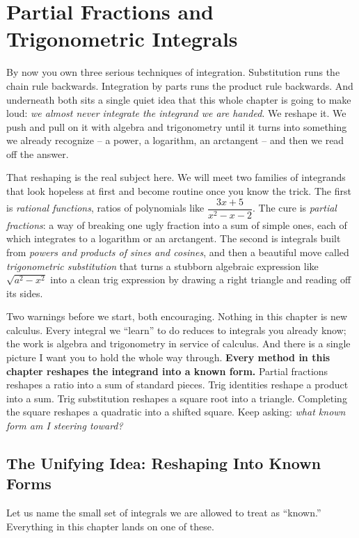 \chapter{Partial Fractions and Trigonometric Integrals}

By now you own three serious techniques of integration. Substitution runs the
chain rule backwards. Integration by parts runs the product rule backwards.
And underneath both sits a single quiet idea that this whole chapter is going
to make loud: \emph{we almost never integrate the integrand we are handed}.
We reshape it. We push and pull on it with algebra and trigonometry until it
turns into something we already recognize -- a power, a logarithm, an
arctangent -- and then we read off the answer.

That reshaping is the real subject here. We will meet two families of
integrands that look hopeless at first and become routine once you know the
trick. The first is \emph{rational functions}, ratios of polynomials like
$\dfrac{3x+5}{x^2-x-2}$. The cure is \emph{partial fractions}: a way of
breaking one ugly fraction into a sum of simple ones, each of which integrates
to a logarithm or an arctangent. The second is integrals built from
\emph{powers and products of sines and cosines}, and then a beautiful move
called \emph{trigonometric substitution} that turns a stubborn algebraic
expression like $\sqrt{a^2 - x^2}$ into a clean trig expression by drawing a
right triangle and reading off its sides.

Two warnings before we start, both encouraging. Nothing in this chapter
is new calculus. Every integral we ``learn'' to do reduces to integrals you
already know; the work is algebra and trigonometry in service of calculus.
And there is a single picture I want you to hold the whole way
through. \textbf{Every method in this chapter reshapes the integrand into a
known form.} Partial fractions reshapes a ratio into a sum of standard pieces.
Trig identities reshape a product into a sum. Trig substitution reshapes a
square root into a triangle. Completing the square reshapes a quadratic into
a shifted square. Keep asking: \emph{what known form am I steering toward?}

\chapterline

\section{The Unifying Idea: Reshaping Into Known Forms}
\label{ch24:reshape}

Let us name the small set of integrals we are allowed to treat as ``known.''
Everything in this chapter lands on one of these.

